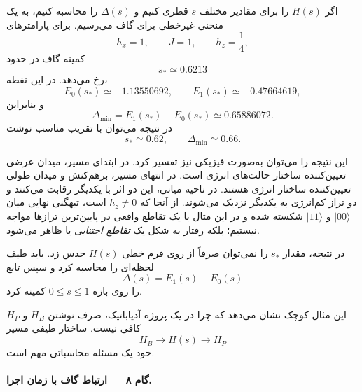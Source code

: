 اگر $H(s)$ را برای مقادیر مختلف $s$ قطری کنیم و $\Delta(s)$ را محاسبه کنیم، به یک منحنی غیرخطی برای گاف می‌رسیم. برای پارامترهای
\begin{equation}
	h_x=1,\qquad J=1,\qquad h_z=\frac14,
\end{equation}
کمینه گاف در حدود
\begin{equation}
	\label{eq:sstar-example}
	s_*\simeq0.6213
\end{equation}
رخ می‌دهد. در این نقطه،
\begin{equation}
	E_0(s_*)\simeq-1.13550692,
	\qquad
	E_1(s_*)\simeq-0.47664619,
\end{equation}
و بنابراین
\begin{equation}
	\label{eq:gapmin-numerical-example}
	\Delta_{\min}
	=
	E_1(s_*)-E_0(s_*)
	\simeq0.65886072.
\end{equation}
در نتیجه می‌توان با تقریب مناسب نوشت
\begin{equation}
	\boxed{
		s_*\simeq0.62,
		\qquad
		\Delta_{\min}\simeq0.66.
	}
\end{equation}

این نتیجه را می‌توان به‌صورت فیزیکی نیز تفسیر کرد. در ابتدای مسیر، میدان عرضی تعیین‌کننده ساختار حالت‌های انرژی است. در انتهای مسیر، برهم‌کنش  و میدان طولی تعیین‌کننده ساختار انرژی هستند. در ناحیه میانی، این دو اثر با یکدیگر رقابت می‌کنند و دو تراز کم‌انرژی به یکدیگر نزدیک می‌شوند. از آنجا که $h_z\neq0$ است، تبهگنی نهایی میان $\lvert00\rangle$ و $\lvert11\rangle$ شکسته شده و در این مثال با یک تقاطع واقعی در پایین‌ترین ترازها مواجه نیستیم؛ بلکه رفتار به شکل یک \emph{تقاطع اجتنابی} یا  ظاهر می‌شود.

در نتیجه، مقدار $s_*$ را نمی‌توان صرفاً از روی فرم خطی $H(s)$ حدس زد. باید طیف لحظه‌ای را محاسبه کرد و سپس تابع
\begin{equation}
	\Delta(s)=E_1(s)-E_0(s)
\end{equation}
را روی بازه $0\leq s\leq1$ کمینه کرد.

این مثال کوچک نشان می‌دهد که چرا در یک پروژه آدیاباتیک، صرف نوشتن $H_B$ و $H_P$ کافی نیست. ساختار طیفی مسیر
\begin{equation}
	H_B
	\longrightarrow
	H(s)
	\longrightarrow
	H_P
\end{equation}
خود یک مسئله محاسباتی مهم است.

\paragraph{گام ۸ --- ارتباط گاف با زمان اجرا.}

